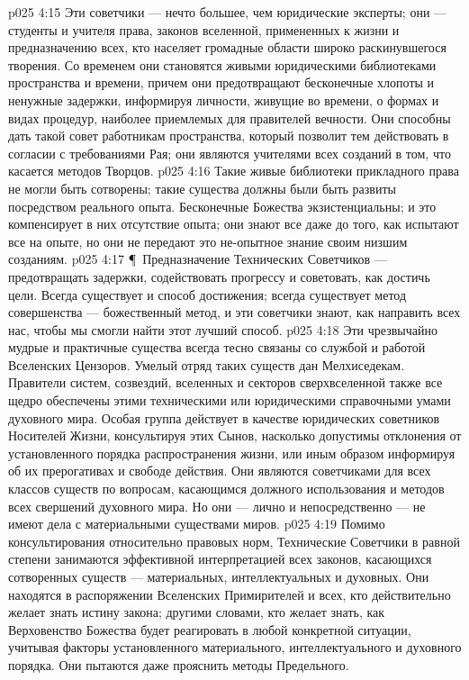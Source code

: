 \vs p025 4:15 Эти советчики --- нечто большее, чем юридические эксперты; они --- студенты и учителя  права, законов вселенной, примененных к жизни и предназначению всех, кто населяет громадные области широко раскинувшегося творения. Со временем они становятся живыми юридическими библиотеками пространства и времени, причем они предотвращают бесконечные хлопоты и ненужные задержки, информируя личности, живущие во времени, о формах и видах процедур, наиболее приемлемых для правителей вечности. Они способны дать такой совет работникам пространства, который позволит тем действовать в согласии с требованиями Рая; они являются учителями всех созданий в том, что касается методов Творцов.
\vs p025 4:16 Такие живые библиотеки прикладного права не могли быть сотворены; такие существа должны были быть развиты посредством реального опыта. Бесконечные Божества экзистенциальны; и это компенсирует в них отсутствие опыта; они знают все даже до того, как испытают все на опыте, но они не передают это не\hyp{}опытное знание своим низшим созданиям.
\vs p025 4:17 \P\ Предназначение Технических Советчиков --- предотвращать задержки, содействовать прогрессу и советовать, как достичь цели. Всегда существует  и  способ достижения; всегда существует метод совершенства --- божественный метод, и эти советчики знают, как направить всех нас, чтобы мы смогли найти этот лучший способ.
\vs p025 4:18 Эти чрезвычайно мудрые и практичные существа всегда тесно связаны со службой и работой Вселенских Цензоров. Умелый отряд таких существ дан Мелхиседекам. Правители систем, созвездий, вселенных и секторов сверхвселенной также все щедро обеспечены этими техническими или юридическими справочными умами духовного мира. Особая группа действует в качестве юридических советников Носителей Жизни, консультируя этих Сынов, насколько допустимы отклонения от установленного порядка распространения жизни, или иным образом информируя об их прерогативах и свободе действия. Они являются советчиками для всех классов существ по вопросам, касающимся должного использования и методов всех свершений духовного мира. Но они --- лично и непосредственно --- не имеют дела с материальными существами миров.
\vs p025 4:19 Помимо консультирования относительно правовых норм, Технические Советчики в равной степени занимаются эффективной интерпретацией всех законов, касающихся сотворенных существ --- материальных, интеллектуальных и духовных. Они находятся в распоряжении Вселенских Примирителей и всех, кто действительно желает знать истину закона; другими словами, кто желает знать, как Верховенство Божества будет реагировать в любой конкретной ситуации, учитывая факторы установленного материального, интеллектуального и духовного порядка. Они пытаются даже прояснить методы Предельного.

